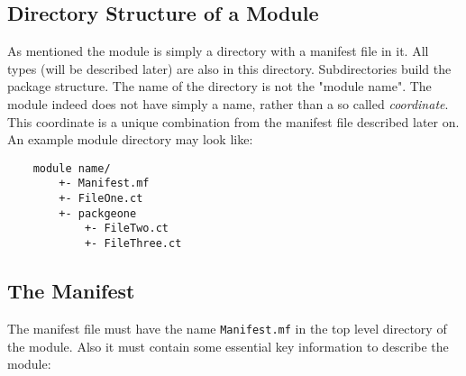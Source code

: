 \documentclass[a4paper,12pt]{report}
\begin{document}
\subsection{Directory Structure of a Module}

As mentioned the module is simply a directory with a manifest file in it. All types (will be described later) are also in this directory. Subdirectories build the package structure. The name of the directory is not the "module name". The module indeed does not have simply a name, rather than a so called \textit{coordinate}. This coordinate is a unique combination from the manifest file described later on. An example module directory may look like:

\begin{verbatim}
    module name/
        +- Manifest.mf
        +- FileOne.ct
        +- packgeone
            +- FileTwo.ct
            +- FileThree.ct
\end{verbatim}

\subsection{The Manifest}

The manifest file must have the name \verb|Manifest.mf| in the top level directory of the module. Also it must contain some essential key information to describe the module:
\end{document}
